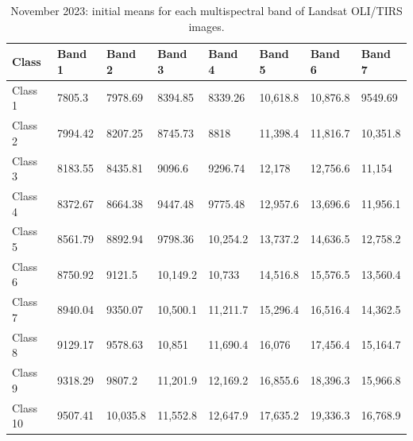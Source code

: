 \documentclass[geomatics,article,accept,pdftex,oneauthor]{Definitions/mdpi}
\begin{document}
\begin{table}[H]
\caption{November 2023: initial means for each multispectral band of Landsat OLI/TIRS images.}\label{tabA06}
\begin{tabularx}{\textwidth}{p{1.5cm} X X X X X X X }
\toprule \textbf{Class} & \textbf{Band 1} & \textbf{Band 2} & \textbf{Band 3} & \textbf{Band 4} & \textbf{Band 5} & \textbf{Band 6} & \textbf{Band 7} \\  \midrule
    Class 1 & 7805.3 & 7978.69 & 8394.85 & 8339.26 & 10,618.8 & 10,876.8 & 9549.69 \\
    Class 2 & 7994.42 & 8207.25 & 8745.73 & 8818 & 11,398.4 & 11,816.7 & 10,351.8 \\
    Class 3 & 8183.55 & 8435.81 & 9096.6 & 9296.74 & 12,178 & 12,756.6 & 11,154 \\
    Class 4 & 8372.67 & 8664.38 & 9447.48 & 9775.48 & 12,957.6 & 13,696.6 & 11,956.1 \\
    Class 5 & 8561.79 & 8892.94 & 9798.36 & 10,254.2 & 13,737.2 & 14,636.5 & 12,758.2 \\
    Class 6 & 8750.92 & 9121.5 & 10,149.2 & 10,733 & 14,516.8 & 15,576.5 & 13,560.4 \\
    Class 7 & 8940.04 & 9350.07 & 10,500.1 & 11,211.7 & 15,296.4 & 16,516.4 & 14,362.5 \\
    Class 8 & 9129.17 & 9578.63 & 10,851 & 11,690.4 & 16,076 & 17,456.4 & 15,164.7 \\
    Class 9 & 9318.29 & 9807.2 & 11,201.9 & 12,169.2 & 16,855.6 & 18,396.3 & 15,966.8 \\
    Class 10 & 9507.41 & 10,035.8 & 11,552.8 & 12,647.9 & 17,635.2 & 19,336.3 & 16,768.9 \\
    \bottomrule
\end{tabularx}
\label{tabA06}
\end{table}

\end{document}
